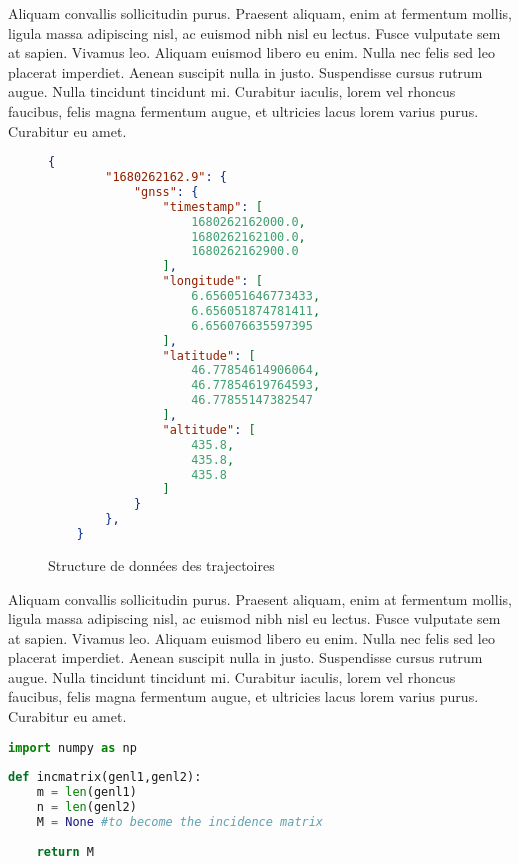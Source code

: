 Aliquam convallis sollicitudin purus. Praesent aliquam, enim at fermentum mollis, ligula massa adipiscing nisl, ac euismod nibh nisl eu lectus. Fusce vulputate sem at sapien. Vivamus leo. Aliquam euismod libero eu enim. Nulla nec felis sed leo placerat imperdiet. Aenean suscipit nulla in justo. Suspendisse cursus rutrum augue. Nulla tincidunt tincidunt mi. Curabitur iaculis, lorem vel rhoncus faucibus, felis magna fermentum augue, et ultricies lacus lorem varius purus. Curabitur eu amet.

\begin{figure}[ht]
    \begin{lstlisting}[language=Json]
    {
        "1680262162.9": {
            "gnss": {
                "timestamp": [
                    1680262162000.0,
                    1680262162100.0, 
                    1680262162900.0
                ],
                "longitude": [
                    6.656051646773433,
                    6.656051874781411,
                    6.656076635597395
                ],
                "latitude": [
                    46.77854614906064,
                    46.77854619764593,
                    46.77855147382547
                ],
                "altitude": [
                    435.8,
                    435.8,
                    435.8
                ]
            }
        },
    }
    \end{lstlisting}
    \caption{Structure de données des trajectoires}\label{fig:fichier_Json}
\end{figure}

Aliquam convallis sollicitudin purus. Praesent aliquam, enim at fermentum mollis, ligula massa adipiscing nisl, ac euismod nibh nisl eu lectus. Fusce vulputate sem at sapien. Vivamus leo. Aliquam euismod libero eu enim. Nulla nec felis sed leo placerat imperdiet. Aenean suscipit nulla in justo. Suspendisse cursus rutrum augue. Nulla tincidunt tincidunt mi. Curabitur iaculis, lorem vel rhoncus faucibus, felis magna fermentum augue, et ultricies lacus lorem varius purus. Curabitur eu amet.\\

\begin{lstlisting}[language=Python, caption=Exemple de fonction Python,captionpos=t]
import numpy as np
    
def incmatrix(genl1,genl2):
    m = len(genl1)
    n = len(genl2)
    M = None #to become the incidence matrix
    
    return M
\end{lstlisting}

